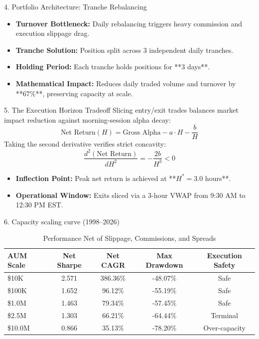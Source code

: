 \documentclass[10pt,aspectratio=169]{beamer}
\begin{document}
\begin{frame}{4. Portfolio Architecture: Tranche Rebalancing}
    \begin{itemize}
        \item \textbf{Turnover Bottleneck:} Daily rebalancing triggers heavy commission and execution slippage drag.
        \item \textbf{Tranche Solution:} Position split across 3 independent daily tranches.
        \item \textbf{Holding Period:} Each tranche holds positions for **3 days**.
        \item \textbf{Mathematical Impact:} Reduces daily traded volume and turnover by **67\%**, preserving capacity at scale.
    \end{itemize}
\end{frame}

\begin{frame}{5. The Execution Horizon Tradeoff}
    Slicing entry/exit trades balances market impact reduction against morning-session alpha decay:
    \begin{equation*}
        \text{Net Return}(H) = \text{Gross Alpha} - a \cdot H - \frac{b}{H}
    \end{equation*}
    Taking the second derivative verifies strict concavity:
    \begin{equation*}
        \frac{d^2(\text{Net Return})}{dH^2} = -\frac{2b}{H^3} < 0
    \end{equation*}
    \begin{itemize}
        \item \textbf{Inflection Point:} Peak net return is achieved at **$H^* = 3.0$ hours**.
        \item \textbf{Operational Window:} Exits sliced via a 3-hour VWAP from 9:30 AM to 12:30 PM EST.
    \end{itemize}
\end{frame}

\begin{frame}{6. Capacity scaling curve (1998--2026)}
    \begin{table}
        \centering
        \caption{Performance Net of Slippage, Commissions, and Spreads}
        \begin{tabular}{lcccc}
            \toprule
            AUM Scale & Net Sharpe & Net CAGR & Max Drawdown & Execution Safety \\
            \midrule
            \$10K & 2.571 & 386.36\% & -48.07\% & Safe \\
            \$100K & 1.652 & 96.12\% & -55.19\% & Safe \\
            \$1.0M & 1.463 & 79.34\% & -57.45\% & Safe \\
            \$2.5M & 1.303 & 66.21\% & -64.44\% & Terminal \\
            \$10.0M & 0.866 & 35.13\% & -78.20\% & Over-capacity \\
            \bottomrule
        \end{tabular}
    \end{table}
\end{frame}
\end{document}
